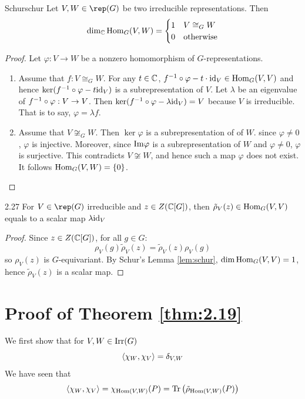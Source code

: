 \documentclass[twoside = false,	%
		headsepline,		%
		parskip = true,
		]{scrbook}						%
\begin{document}
    \begin{lemma}{Schur}{schur}
        Let $V,W \in \rep(G)$ be two irreducible representations. Then
        $$\dim_\mathbb C\mathrm{Hom}_G(V,W)=\begin{cases}
            1 & V\cong_G W\\
            0 & \text{otherwise}
        \end{cases}$$
    \end{lemma}
    \begin{proof}
        Let $\varphi: V \to W$  be a nonzero homomorphism of $G$-representations.
        \begin{enumerate}
            \item Assume that $f:V\cong_G W$. For any $t\in\mathbb C$, $f^{-1}\circ\varphi-t\cdot\mathrm{id}_V\in\mathrm{Hom}_G(V,V)$ and hence $\ker(f^{-1}\circ\varphi-t\mathrm{id}_V)$ is a subrepresentation of $V$. Let $\lambda$ be an eigenvalue of $f^{-1}\circ\varphi:V\to V$. Then $\ker(f^{-1}\circ\varphi-\lambda\mathrm{id}_V) = V$ because $V$ is irreducible. That is to say, $\varphi=\lambda f$.
            \item Assume that $V\not\cong_G W$. Then $\ker\varphi$ is a subrepresentation of of $W$. since $\varphi\neq 0$, $\varphi$ is injective. Moreover, since $\mathrm{Im}\varphi$ is a subrepresentation of $W$ and $\varphi\neq 0$, $\varphi$ is surjective. This contradicts $V\not\cong W$, and hence such a map $\varphi$ does not exist. It follows $\mathrm{Hom}_G(V,W)=\left\{ 0\right\}$.
        \end{enumerate}
    \end{proof}
    \begin{corollary}{}{2.27}
        For $V\in\rep(G)$ irreducible and $z\in Z(\mathbb C[G])$, then $\tilde\rho_V(z) \in \mathrm{Hom}_G(V,V)$ equals to a scalar map $\lambda\mathrm{id}_V$
    \end{corollary}

    \begin{proof}
        Since $z \in Z(\mathbb C[G])$, for all $g \in G:$
        \begin{equation*}
            \rho_V(g) \tilde \rho_V(z) = \tilde \rho_V(z) \rho_V(g)
        \end{equation*}
        so $\rho_V(z)$ is $G$-equivariant. By Schur's Lemma \ref{lem:schur}, $\dim \mathrm{Hom}_G(V,V) = 1$, hence $\tilde \rho_V(z)$ is a scalar map.
    \end{proof}
    
\section{Proof of Theorem \ref{thm:2.19}}
    We first show that for $V,W\in\mathrm{Irr}(G)$ $$\left\langle \chi_W,\chi_V\right\rangle=\delta_{V,W}$$
    We have seen that $$\left\langle \chi_W,\chi_V\right\rangle=\chi_{\mathrm{Hom}(V,W)}(P)=\mathrm{Tr}\left( \tilde\rho_{\mathrm{Hom}(V,W)}(P)\right)$$
\end{document}
